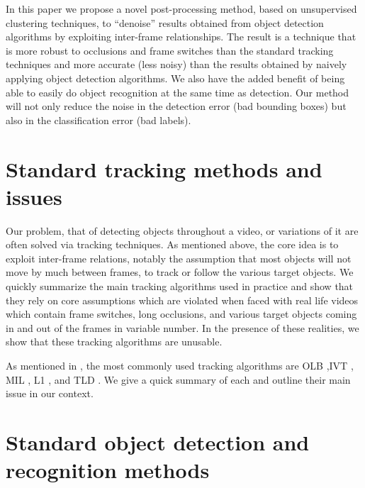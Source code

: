 \documentclass{article}
\begin{document}
In this paper we propose a novel post-processing method, based on unsupervised clustering techniques, to ``denoise'' results obtained 
from object detection algorithms by exploiting inter-frame relationships. The result is a technique that is more robust to occlusions and frame switches than the standard 
tracking techniques and more accurate (less noisy) than the results obtained by naively applying object detection algorithms. We also have the added benefit of being able to easily
do object recognition at the same time as detection. Our method will not only reduce the noise in the detection error (bad bounding boxes) but also in the classification error (bad labels).

\section{Standard tracking methods and issues}

Our problem, that of detecting objects throughout a video, or variations of it are often solved via tracking techniques. As mentioned above, the core idea is to exploit
inter-frame relations, notably the assumption that most objects will not move by much between frames, to track or follow the various target objects. We quickly summarize
the main tracking algorithms used in practice and show that they rely on core assumptions which are violated 
when faced with real life videos which contain frame switches, long occlusions, and various target objects coming in and out 
of the frames in variable number. In the presence of these realities, we show that these tracking algorithms are unusable.

As mentioned in \cite{benchmarksurvey}, the most commonly used tracking algorithms are OLB \cite{OLB},IVT \cite{IVT}, MIL \cite{miltrack}, L1 \cite{L1}, and TLD \cite{TLD}.
We give a quick summary of each and outline their main issue in our context.


\cite{miltrack} %
\cite{OLB} %
\cite{IVT} %
\cite{L1} %
\cite{TLD} %


\section{Standard object detection and recognition methods}
\end{document}
